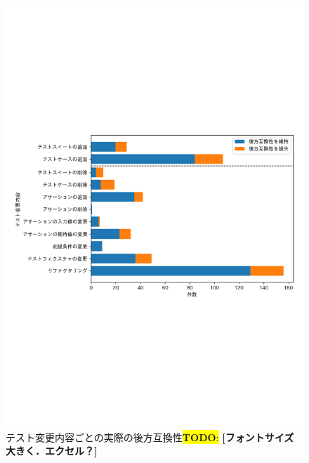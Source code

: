 \documentclass[submit]{ipsj}
\newcommand{\todo}[1]{\colorbox{yellow}{{\bf TODO}:}{\color{red} {\textbf{[#1]}}}}
\begin{document}

\begin{figure}[t]
  \centering
  \includegraphics[width=1.0\linewidth]{IPSJjournal_maekawa_fig/barh-test-pattern.pdf}
  \caption{テスト変更内容ごとの実際の後方互換性\todo{フォントサイズ大きく．エクセル？}}
  \label{fig:test_pattern}
\end{figure}
\end{document}
